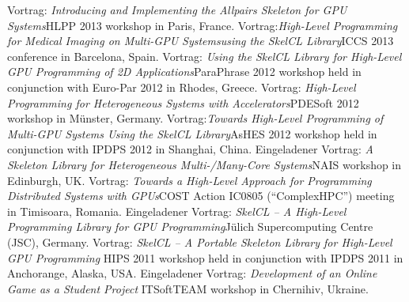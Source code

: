 \documentclass[11pt,a4paper]{moderncv}
\begin{document}
         {Vortrag: \emph{Introducing and Implementing the Allpairs Skeleton for GPU
          Systems}\newline \small HLPP 2013 workshop in Paris, France.}
         {Vortrag:\emph{High-Level Programming for Medical Imaging on Multi-GPU
          Systems\newline using the SkelCL Library}\newline \small ICCS 2013 conference in
          Barcelona, Spain.}
       {Vortrag: \emph{Using the SkelCL Library for High-Level GPU Programming of
        2D Applications}\newline \small ParaPhrase 2012 workshop held in
        conjunction with Euro-Par 2012 in Rhodes, Greece.}
       {Vortrag: \emph{High-Level Programming for Heterogeneous Systems with
        Accelerators}\newline \small PDESoft 2012 workshop in Münster, Germany.}
       {Vortrag:\emph{Towards High-Level Programming of Multi-GPU Systems Using
        the SkelCL Library}\newline \small AsHES 2012 workshop held in
        conjunction with IPDPS 2012 in Shanghai, China.}
       {Eingeladener Vortrag: \emph{A Skeleton Library for Heterogeneous
        Multi-/Many-Core Systems}\newline \small NAIS workshop in Edinburgh, UK.}
       {Vortrag: \emph{Towards a High-Level Approach for Programming Distributed
        Systems with GPUs}\newline \small COST Action IC0805 (``ComplexHPC'')
        meeting in Timisoara, Romania.}
       {Eingeladener Vortrag: \emph{SkelCL -- A High-Level Programming Library for GPU
        Programming}\newline \small Jülich Supercomputing Centre (JSC), Germany.}
       {Vortrag: \emph{SkelCL -- A Portable Skeleton Library for High-Level
        GPU Programming}\newline
        \small HIPS 2011 workshop held in conjunction with IPDPS 2011 in
        Anchorange, Alaska, USA.}
       {Eingeladener Vortrag: \emph{Development of an Online Game as a Student Project}\newline
        \small ITSoftTEAM workshop in Chernihiv, Ukraine.}
\end{document}
